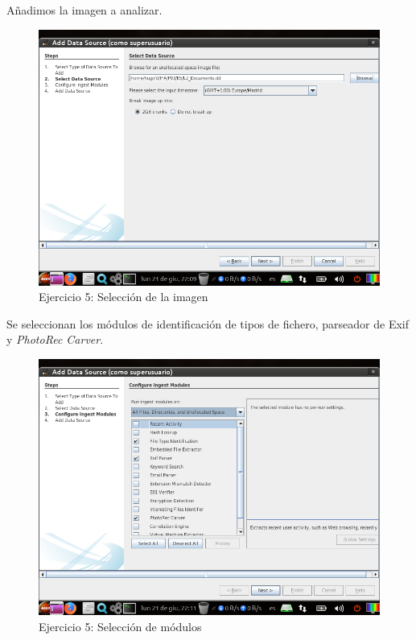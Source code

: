 \documentclass[11pt]{article}
\begin{document}
Añadimos la imagen a analizar.

\begin{figure}[H]
    \caption{Ejercicio 5: Selección de la imagen}
    \centering
    \includegraphics[scale=0.7]{e5-3.png}
\end{figure}

Se seleccionan los módulos de identificación de tipos de fichero, parseador de Exif y \textit{PhotoRec Carver}.

\begin{figure}[H]
    \caption{Ejercicio 5: Selección de módulos}
    \centering
    \includegraphics[scale=0.7]{e5-4.png}
\end{figure}
\end{document}

